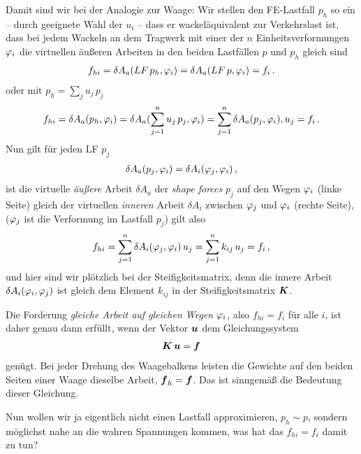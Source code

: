 Damit sind wir bei der  Analogie zur Waage: Wir stellen den FE-Lastfall $p_h $ so ein -- durch geeignete Wahl der $u_i$ -- dass er \glq wackel\"{a}quivalent\grq{} zur Verkehrslast ist, dass bei jedem Wackeln an dem Tragwerk mit einer der $n$ Einheitsverformungen $\varphi_i$ die virtuellen \"{a}u{\ss}eren Arbeiten in den beiden Lastf\"{a}llen $p$ und $p_h$ gleich sind
\begin{align}
f_{hi} =\delta A_a(LF\,p_h,\varphi_i) = \delta A_a(LF\,p,\varphi_i) = f_i\,.
\end{align}
oder mit $p_h = \sum_j u_j\,p_j$
\begin{align}
f_{hi} =\delta A_a(p_h,\varphi_i) = \delta A_a(\sum_{j = 1}^n u_j\,p_j,\varphi_i) = \sum_{j = 1}^n \delta A_a(p_j,\varphi_i),u_j = f_i\,.
\end{align}
Nun gilt f\"{u}r jeden LF $p_j$
\begin{align}
\delta A_a(p_j, \varphi_i) = \delta A_i(\varphi_j,\varphi_i)\,,
\end{align}
ist die virtuelle {\em \"{a}u{\ss}ere\/} Arbeit $\delta A_a$ der {\em shape forces\/} $p_j$ auf den Wegen $\varphi_i$ (linke Seite) gleich der  virtuellen {\em inneren\/} Arbeit $\delta A_i$ zwischen $\varphi_j$ und $\varphi_i$ (rechte Seite), ($\varphi_j$ ist die Verformung im Lastfall $p_j$) gilt also
\begin{align}
f_{hi} =\sum_{j = 1}^n \delta A_i(\varphi_j,\varphi_i)\,u_j = \sum_{j = 1}^n k_{ij}\,u_j = f_i\,,
\end{align}
und hier sind wir pl\"{o}tzlich bei der Steifigkeitsmatrix, denn die innere Arbeit $\delta A_i(\varphi_i,\varphi_j)$
ist gleich dem Element $k_{ij} $ in der Steifigkeitsmatrix $\mbox{\boldmath $K$} $.

Die Forderung {\em gleiche Arbeit auf gleichen Wegen\/} $\varphi_i$, also $f_{hi} = f_i$ f\"{u}r alle $i$, ist daher genau dann erf\"{u}llt, wenn der Vektor $\mbox{\boldmath $u$} $ dem Gleichungssystem
\begin{align}
\mbox{\boldmath $K$}\,\mbox{\boldmath $u$} = \mbox{\boldmath $f$}
\end{align}
gen\"{u}gt. Bei jeder Drehung des Waagebalkens leisten die Gewichte auf den beiden Seiten einer Waage dieselbe Arbeit, $\mbox{\boldmath $f$}_h = \mbox{\boldmath $f$}$. Das ist sinngem\"{a}{\ss} die Bedeutung dieser Gleichung.

Nun wollen wir ja eigentlich nicht einen Lastfall approximieren, $p_h \sim p$, sondern m\"{o}glichst nahe an die wahren Spannungen kommen, was hat das $f_{hi} = f_i $ damit zu tun?

